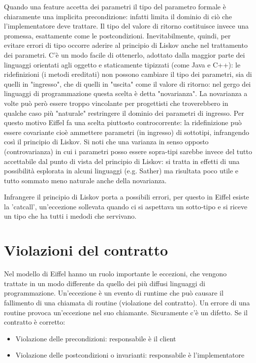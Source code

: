 \documentclass[a4paper,12pt,titlepage,oneside]{book}
\begin{document}
    Quando una feature accetta dei parametri il tipo del parametro formale è chiaramente una implicita precondizione: infatti limita il dominio di ciò che l’implementatore deve trattare. Il tipo del valore di ritorno costituisce 
    invece una promessa, esattamente come le postcondizioni. Inevitabilmente, quindi, per evitare errori di tipo occorre aderire al principio di Liskov anche nel trattamento dei parametri. C’è un modo facile di ottenerlo, 
    adottato dalla maggior parte dei linguaggi orientati agli oggetto e staticamente tipizzati (come Java e C++): le ridefinizioni (i metodi ereditati) non possono cambiare il tipo dei parametri, sia di quelli in "ingresso", 
    che di quelli in "uscita" come il valore di ritorno: nel gergo dei linguaggi di programmazione questa scelta è detta "novarianza". La novarianza a volte può però essere troppo vincolante per progettisti che troverebbero in 
    qualche caso più "naturale" restringere il dominio dei parametri di ingresso. Per questo motivo Eiffel fa una scelta piuttosto controcorrente: la ridefinizione può essere covariante cioè ammettere parametri (in ingresso) di 
    sottotipi, infrangendo così il principio di Liskov. Si noti che una varianza in senso opposto (controvarianza) in cui i parametri posso essere sopra-tipi sarebbe invece del tutto accettabile dal punto di vista del principio 
    di Liskov: si tratta in effetti di una possibilità esplorata in alcuni linguaggi (e.g. Sather) ma risultata poco utile e tutto sommato meno naturale anche della novarianza.

    Infrangere il principio di Liskov porta a possibili errori, per questo in Eiffel esiste la 'catcall', un'eccezione sollevata quando ci si aspettava un sotto-tipo e si riceve un tipo che ha tutti i medodi che servivano.

\section{Violazioni del contratto}
    Nel modello di Eiffel hanno un ruolo importante le eccezioni, che vengono trattate in un modo differente da quello dei più diffusi linguaggi di programmazione.
    Un'eccezione è un evento di runtime che può causare il fallimento di una chiamata di routine (violazione del contratto). Un errore di una routine provoca un'eccezione nel suo chiamante.
    Sicuramente c'è un difetto.
    Se il contratto è corretto:
\begin{itemize}
    \item Violazione delle precondizioni: responsabile è il client
    \item Violazione delle postcondizioni o invarianti: responsabile è l'implementatore
\end{itemize}
\end{document}
